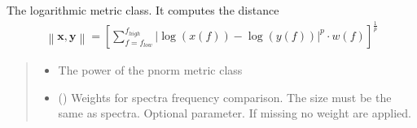 \documentclass[letterpaper,10pt,english]{sphinxmanual}
\begin{document}
\begin{fulllineitems}
\label{\detokenize{api_support:amw.mw.parameters.LogMetric}}
\pysigstartsignatures
{}
\pysigstopsignatures
\sphinxAtStartPar
The logarithmic metric class. It computes the distance
\begin{equation*}
\begin{split}\left\| \textbf{x},\textbf{y} \right\|=
\left[\sum_{f=f_{low}}^{f_{high}}{\left| \log\left( x\left(f\right) \right)-
\log\left( y\left(f\right) \right)\right|^p\cdot
w\left(f\right)}\right]^\frac{1}{p}\end{split}
\end{equation*}\begin{quote}\begin{description}
\begin{itemize}
\item {} 
\sphinxAtStartPar
{} \textendash{} The power of the p\sphinxhyphen{}norm metric class

\item {} 
\sphinxAtStartPar
{} (\sphinxstyleliteralemphasis{\sphinxupquote{(}}\sphinxstyleliteralemphasis{\sphinxupquote{)}}) \textendash{} Weights for spectra frequency comparison. The size must be the same as spectra.
Optional parameter. If missing no weight are applied.

\end{itemize}

\end{description}\end{quote}

\end{fulllineitems}

\end{document}
